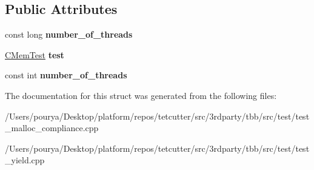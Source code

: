 \subsection*{Public Attributes}
\begin{DoxyCompactItemize}
\item 
\hypertarget{structRoundRobin_a986e2a8f56a8dfce146446e7c3382803}{}const long {\bfseries number\+\_\+of\+\_\+threads}\label{structRoundRobin_a986e2a8f56a8dfce146446e7c3382803}

\item 
\hypertarget{structRoundRobin_aa75ef11d61eeb0c2a37ff42ec1805e78}{}\hyperlink{classCMemTest}{C\+Mem\+Test} {\bfseries test}\label{structRoundRobin_aa75ef11d61eeb0c2a37ff42ec1805e78}

\item 
\hypertarget{structRoundRobin_ab465896c501db18634244537cfb61fcd}{}const int {\bfseries number\+\_\+of\+\_\+threads}\label{structRoundRobin_ab465896c501db18634244537cfb61fcd}

\end{DoxyCompactItemize}


The documentation for this struct was generated from the following files\+:\begin{DoxyCompactItemize}
\item 
/\+Users/pourya/\+Desktop/platform/repos/tetcutter/src/3rdparty/tbb/src/test/test\+\_\+malloc\+\_\+compliance.\+cpp\item 
/\+Users/pourya/\+Desktop/platform/repos/tetcutter/src/3rdparty/tbb/src/test/test\+\_\+yield.\+cpp\end{DoxyCompactItemize}
